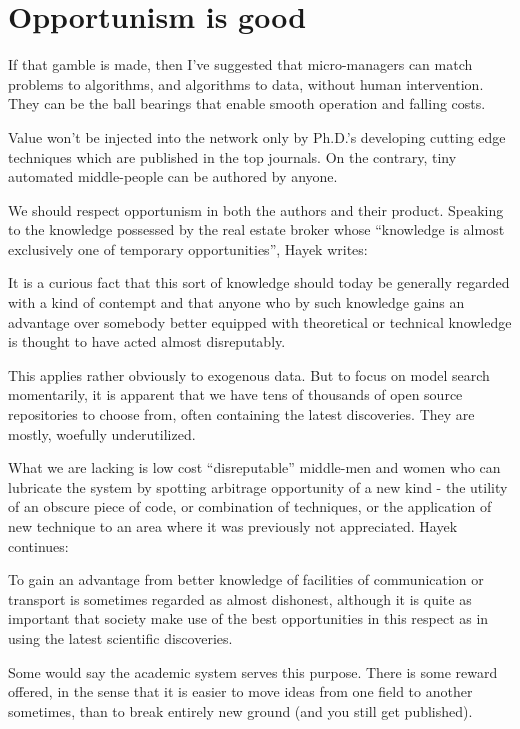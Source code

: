 \section{Opportunism is good}

If that gamble is made, then I've suggested that micro-managers can match problems to algorithms, and algorithms to data, without human intervention. They can be the ball bearings that enable smooth operation and falling costs.

Value won't be injected into the network only by Ph.D.'s developing cutting edge techniques which are published in the top journals. On the contrary, tiny automated middle-people can be authored by anyone.

We should respect opportunism in both the authors and their product. Speaking to the knowledge possessed by the real estate broker whose ``knowledge is almost exclusively one of temporary opportunities'', Hayek writes:

\begin{oldquote}
    It is a curious fact that this sort of knowledge should today be generally regarded with a kind of contempt and that anyone who by such knowledge gains an advantage over somebody better equipped with theoretical or technical knowledge is thought to have acted almost disreputably. 
\end{oldquote}
This applies rather obviously to exogenous data. But to focus on model search momentarily, it is apparent that we have tens of thousands of open source repositories to choose from, often containing the latest discoveries. They are mostly, woefully underutilized. 

What we are lacking is low cost ``disreputable'' middle-men and women who can lubricate the system by spotting arbitrage opportunity of a new kind - the utility of an obscure piece of code, or combination of techniques, or the application of new technique to an area where it was previously not appreciated. Hayek continues:

\begin{oldquote}
To gain an advantage from better knowledge of facilities of communication or transport is sometimes regarded as almost dishonest, although it is quite as important that society make use of the best opportunities in this respect as in using the latest scientific discoveries.
\end{oldquote}

Some would say the academic system serves this purpose. There is some reward offered, in the sense that it is easier to move ideas from one field to another sometimes, than to break entirely new ground (and you still get published).  

